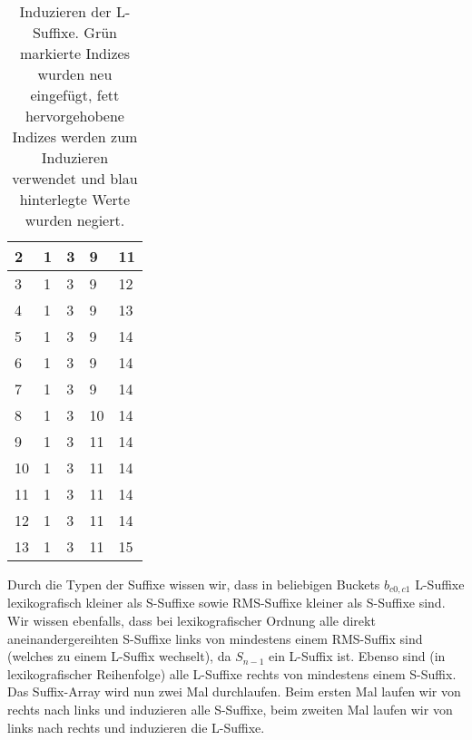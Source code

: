 \begin{table}
\begin{tabular}{l|l|l|l|l}
		2       & 1                 & \cellcolor[HTML]{32CB00}3 & 9                          & 11                         \\ \hline
		3       & 1                 & 3                         & 9                          & \cellcolor[HTML]{32CB00}12 \\ \hline
		4       & 1                 & 3                         & 9                          & \cellcolor[HTML]{32CB00}13 \\ \hline
		5       & 1                 & 3                         & 9                          & \cellcolor[HTML]{32CB00}14 \\ \hline
		6       & 1                 & 3                         & 9                          & 14                         \\ \hline
		7       & 1                 & 3                         & 9                          & 14                         \\ \hline
		8       & 1                 & 3                         & \cellcolor[HTML]{32CB00}10 & 14                         \\ \hline
		9       & 1                 & 3                         & \cellcolor[HTML]{32CB00}11 & 14                         \\ \hline
		10      & 1                 & 3                         & 11                         & 14                         \\ \hline
		11      & 1                 & 3                         & 11                         & 14                         \\ \hline
		12      & 1                 & 3                         & 11                         & 14                         \\ \hline
		13      & 1                 & 3                         & 11                         & \cellcolor[HTML]{32CB00}15 \\ \hline
	\end{tabular}%
	\caption{Induzieren der L-Suffixe. Grün markierte Indizes wurden neu eingefügt, fett hervorgehobene Indizes werden zum Induzieren verwendet und blau hinterlegte Werte wurden negiert.}
	\label{dss:table:induce-l}
\end{table}


Durch die Typen der Suffixe wissen wir, dass in beliebigen Buckets $b_{c0,c1}$ L-Suffixe lexikografisch kleiner als S-Suffixe sowie RMS-Suffixe kleiner als S-Suffixe sind. Wir wissen ebenfalls, dass bei lexikografischer Ordnung alle direkt aneinandergereihten S-Suffixe links von mindestens einem RMS-Suffix sind (welches zu einem L-Suffix wechselt), da $S_{n-1}$ ein L-Suffix ist. Ebenso sind (in lexikografischer Reihenfolge) alle L-Suffixe rechts von mindestens einem S-Suffix. Das Suffix-Array wird nun zwei Mal durchlaufen. Beim ersten Mal laufen wir von rechts nach links und induzieren alle S-Suffixe, beim zweiten Mal laufen wir von links nach rechts und induzieren die L-Suffixe.

